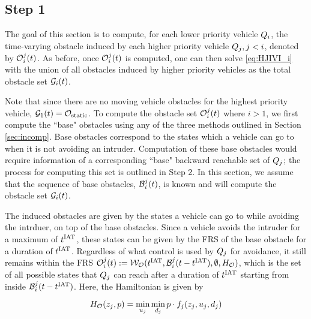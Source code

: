 \subsection{Step 1}
The goal of this section is to compute, for each lower priority vehicle $Q_{i}$, the time-varying obstacle induced by each higher priority vehicle $Q_{j}, j < i$, denoted by $\mathcal{O}_i^j(t)$. As before, once $\mathcal{O}_i^j(t)$ is computed, one can then solve \eqref{eq:HJIVI_i} with the union of all obstacles induced by higher priority vehicles as the total obstacle set $\mathcal{G}_i(t)$. 

Note that since there are no moving vehicle obstacles for the highest priority vehicle, $\mathcal{G}_1(t) = \mathcal{O}_\text{static}$. To compute the obstacle set $\mathcal{O}_i^j(t)$ where $i> 1$, we first compute the ``base" obstacles using any of the three methods outlined in Section \ref{sec:incomp}. Base obstacles correspond to the states which a vehicle can go to when it is not avoiding an intruder. Computation of these base obstacles would require information of a corresponding ``base" backward reachable set of $Q_{j}$; the process for computing this set is outlined in Step 2. In this section, we assume that the sequence of base obstacles, $\mathcal{B}_i^j(t)$, is known and will compute the obstacle set $\mathcal{G}_i(t)$. 

The induced obstacles are given by the states a vehicle can go to while avoiding the intrduer, on top of the base obstacles. Since a vehicle avoids the intruder for a maximum of 
$t^\text{IAT}$, these states can be given by the FRS of the base obstacle for a duration of $t^\text{IAT}$. Regardless of what control is used by $Q_{j}$ for avoidance, it still remains within the FRS $\mathcal{O}_i^j(t) := \mathcal{W}_{\mathcal{O}}(t^\text{IAT}, \mathcal{B}_i^j(t-t^\text{IAT}), \emptyset, H_{\mathcal{O}})$, which is the set of all possible states that $Q_{j}$ can reach after a duration of $t^\text{IAT}$ starting from inside $\mathcal{B}_i^j(t-t^\text{IAT})$. Here, the Hamiltonian is given by

\begin{equation}
H_{\mathcal{O}}(z_j, p) = \min_{u_j} \min_{d_j} p \cdot f_j (z_j, u_j, d_j)
\end{equation}

